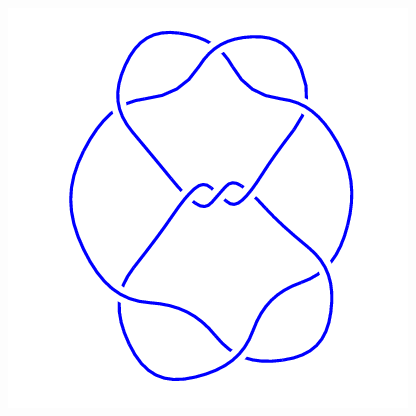 \begin{figure}[H]
\begin{minipage}[b]{.18\linewidth}
	\end{minipage}
	\begin{minipage}[b]{.18\linewidth}
		\centering
		\includegraphics[width=\linewidth]{../data/9_35.png}
	\end{minipage}
\end{figure}
